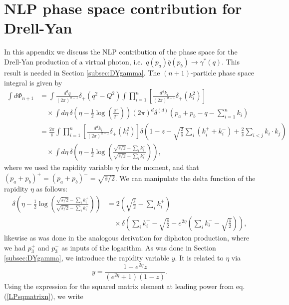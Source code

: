 \documentclass[11pt]{article}
\newcommand{\s}{\hat{s}}
\newcommand\eqn[1]     {eq.\,(\ref{#1})}
\begin{document}
\section{NLP phase space contribution for Drell-Yan}\label{app: DYPS}
In this appendix we discuss the NLP contribution of the phase space for the Drell-Yan production of a virtual photon, i.e.\ $q(p_a)\bar q(p_b)\to \gamma^*(q)$. This result is needed in Section \ref{subsec:DYgamma}. The $(n+1)$-particle phase space integral is given by 
\begin{align}
    \int d\Phi_{n+1} &= \int \frac{d^dq}{(2\pi)^{d-1}}\delta_+(q^2-Q^2)\int \prod_{i=1}^n\left[\frac{d^dk_i}{(2\pi)^{d-1}}\delta_+(k_i^2)\right] \nonumber \\
    &\quad\times \int d\eta\, \delta\left(\eta-\frac12\log\left(\frac{q^+}{q^-}\right)\right)(2\pi)^d\delta^{(d)}\left(p_a+p_b-q-\sum_{i=1}^nk_i\right) \nonumber \\
    &= \frac{2\pi}{\s}\int \prod_{i=1}^n\left[\frac{d^dk_i}{(2\pi)^{d-1}}\delta_+(k_i^2)\right]\delta\left(1-z-\sqrt{\frac{2}{\s}}\sum_i(k_i^++k_i^-)+\frac{2}{\s}\sum_{i<j}k_i\cdot k_j\right)\nonumber \\
    &\quad\times \int d\eta \, \delta\left(\eta-\frac12\log\left(\frac{\sqrt{\s/2}-\sum_i k_i^+}{\sqrt{\s/2}-\sum_i k_i^-}\right)\right),\label{DYNLPPSint}
\end{align}
where we used the rapidity variable $\eta$ for the moment, and that $(p_a+p_b)^+=(p_a+p_b)^- = \sqrt{\s/2}$. We can manipulate the delta function of the rapidity $\eta$ as follows:
\begin{align}
    \delta\left(\eta-\frac12\log\left(\frac{\sqrt{\s/2}-\sum_i k_i^+}{\sqrt{\s/2}-\sum_i k_i^-}\right)\right) &= 2\left(\sqrt{\frac{\s}{2}}-\sum_i k_i^+\right)\nonumber\\
    &\quad\times\delta\left(\sum_i k_i^+-\sqrt{\frac{\s}{2}}-e^{2\eta}\left(\sum_i k_i^--\sqrt{\frac{\s}{2}}\right)\right),
\end{align}
likewise as was done in the analogous derivation for diphoton production, where we had $p_3^+$ and $p_3^-$ as inputs of the logarithm. 
As was done in Section \ref{subsec:DYgamma}, we introduce the rapidity variable $y$. It is related to $\eta$ via
\begin{equation}\label{ydefeta}
    y = \frac{1-e^{2\eta}z}{(e^{2\eta}+1)(1-z)}.
\end{equation}
Using the expression for the squared matrix element at leading power from \eqn{LPsqmatrixn}, we write
\end{document}
